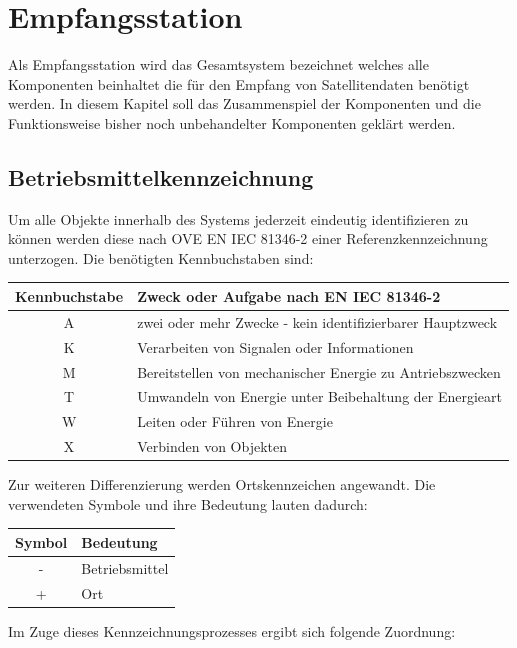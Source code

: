 \chapter{Empfangsstation}
Als Empfangsstation wird das Gesamtsystem bezeichnet welches alle Komponenten beinhaltet die für den Empfang von Satellitendaten benötigt werden. In diesem Kapitel soll das Zusammenspiel der Komponenten und die Funktionsweise bisher noch unbehandelter Komponenten geklärt werden.

\section{Betriebsmittelkennzeichnung}
Um alle Objekte innerhalb des Systems jederzeit eindeutig identifizieren zu können werden diese nach OVE EN IEC 81346-2 einer Referenzkennzeichnung unterzogen. Die benötigten Kennbuchstaben sind:

\begin{tabular}{|c|l|}
	\hline
	\textbf{Kennbuchstabe} & \textbf{Zweck oder Aufgabe nach EN IEC 81346-2} \\
	\hline
	A & zwei oder mehr Zwecke - kein identifizierbarer Hauptzweck \\
	\hline
	K & Verarbeiten von Signalen oder Informationen \\
	\hline
	M & Bereitstellen von mechanischer Energie zu Antriebszwecken \\
	\hline
	T & Umwandeln von Energie unter Beibehaltung der Energieart \\
	\hline
	W & Leiten oder Führen von Energie \\
	\hline
	X & Verbinden von Objekten \\
	\hline
\end{tabular}

Zur weiteren Differenzierung werden Ortskennzeichen angewandt. Die verwendeten Symbole und ihre Bedeutung lauten dadurch:

\begin{tabular}{|c|l|}
	\hline
	\textbf{Symbol} & \textbf{Bedeutung} \\
	\hline
	- & Betriebsmittel \\
	\hline
	+ & Ort \\
	\hline
\end{tabular}

Im Zuge dieses Kennzeichnungsprozesses ergibt sich folgende Zuordnung:

